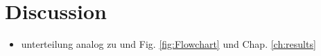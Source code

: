 \chapter{Discussion}
\label{ch:discussion}
\begin{itemize}
    \item unterteilung analog zu  und Fig. \ref{fig:Flowchart} und Chap. \ref{ch:results}
\end{itemize}




